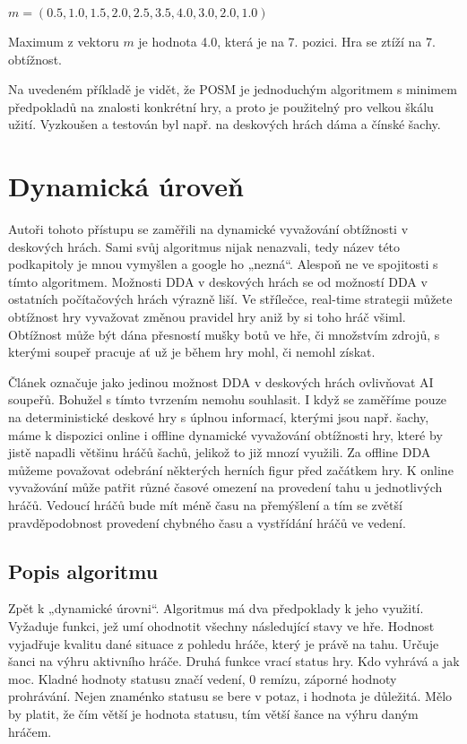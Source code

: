 $m=(0.5,1.0,1.5,2.0,2.5,3.5,4.0,3.0,2.0,1.0)$

Maximum z vektoru $m$ je hodnota 4.0, která je na 7. pozici. Hra se ztíží na 7. obtížnost.

Na uvedeném příkladě je vidět, že POSM je jednoduchým algoritmem s minimem předpokladů na znalosti konkrétní hry, a proto je použitelný pro velkou škálu užití. Vyzkoušen a testován byl např. na deskových hrách dáma a čínské šachy. \cite{23posm2}

\section{Dynamická úroveň} \label{sec-dynlevel}

Autoři tohoto přístupu se zaměřili na dynamické vyvažování obtížnosti v deskových hrách. \cite{24DynLev} Sami svůj algoritmus nijak nenazvali, tedy název této podkapitoly je mnou vymyšlen a google ho „nezná“. Alespoň ne ve spojitosti s tímto algoritmem.
Možnosti DDA v deskových hrách se od možností DDA v ostatních počítačových hrách výrazně liší. Ve střílečce, real-time strategii můžete obtížnost hry vyvažovat změnou pravidel hry aniž by si toho hráč všiml. Obtížnost může být dána přesností mušky botů ve hře, či množstvím zdrojů, s kterými soupeř pracuje ať už je během hry mohl, či nemohl získat.

Článek označuje jako jedinou možnost DDA v deskových hrách ovlivňovat AI soupeřů. Bohužel s tímto tvrzením nemohu souhlasit. I když se zaměříme pouze na deterministické deskové hry s úplnou informací, kterými jsou např. šachy, máme k dispozici online i offline dynamické vyvažování obtížnosti hry, které by jistě napadli většinu hráčů šachů, jelikož to již mnozí využili. Za offline DDA můžeme považovat odebrání některých herních figur před začátkem hry. K online vyvažování může patřit různé časové omezení na provedení tahu u jednotlivých hráčů. Vedoucí hráčů bude mít méně času na přemýšlení a tím se zvětší pravděpodobnost provedení chybného času a vystřídání hráčů ve vedení.

\subsection{Popis algoritmu}

Zpět k „dynamické úrovni“. Algoritmus má dva předpoklady k jeho využití. Vyžaduje funkci, jež umí ohodnotit všechny následující stavy ve hře. Hodnost vyjadřuje kvalitu dané situace z pohledu hráče, který je právě na tahu. Určuje šanci na výhru aktivního hráče.
Druhá funkce vrací status hry. Kdo vyhrává a jak moc. Kladné hodnoty statusu značí vedení, 0 remízu, záporné hodnoty prohrávání. Nejen znaménko statusu se bere v potaz, i hodnota je důležitá. Mělo by platit, že čím větší je hodnota statusu, tím větší šance na výhru daným hráčem.


